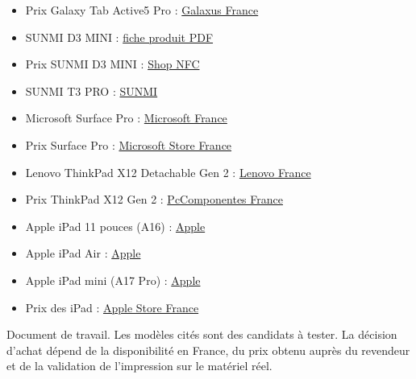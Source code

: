 \documentclass[11pt,a4paper]{article}
\newcommand{\source}[2]{\href{#2}{#1}}
\begin{document}
{\begin{multicols}{2}
\begin{itemize}[itemsep=0pt,topsep=0pt,leftmargin=4mm]
  \item Prix Galaxy Tab Active5 Pro :
  \source{Galaxus France}{https://www.galaxus.fr/fr/s1/product/samsung-galaxy-tab-active5-pro-edition-entreprise-5g-1010-128-go-vert-tablette-57860971}
  \item SUNMI D3 MINI :
  \source{fiche produit PDF}{https://file.cdn.sunmi.com/newebsite/products/d3-mini/specs/d3-mini-en.pdf}
  \item Prix SUNMI D3 MINI :
  \source{Shop NFC}{https://www.shopnfc.com/fr/terminaux-nfc-sunmi/679-sunmi-d3-mini-terminal-de-point-de-vente-android-gms-imprimante-80-mm-cable-ue.html}
  \item SUNMI T3 PRO :
  \source{SUNMI}{https://www.sunmi.com/en-US/t3-pro-series/}
  \item Microsoft Surface Pro :
  \source{Microsoft France}{https://www.microsoft.com/fr-fr/surface/devices/surface-pro/}
  \item Prix Surface Pro :
  \source{Microsoft Store France}{https://www.microsoft.com/fr-fr/store/collections/consumersurface/}
  \item Lenovo ThinkPad X12 Detachable Gen 2 :
  \source{Lenovo France}{https://www.lenovo.com/fr/fr/p/laptops/thinkpad/thinkpadx/lenovo-thinkpad-x12-gen-2-12-inch-intel/21lkcto1wwfr2}
  \item Prix ThinkPad X12 Gen 2 :
  \source{PcComponentes France}{https://www.pccomponentes.fr/portable-lenovo-thinkpad-x12-detachable-gen-2-123-intel-core-ultra-5-134u-16gb-512gb-ssd-intel-graphics-windows-11-pro}
  \item Apple iPad 11 pouces (A16) :
  \source{Apple}{https://www.apple.com/fr/ipad-11/}
  \item Apple iPad Air :
  \source{Apple}{https://www.apple.com/fr/ipad-air/}
  \item Apple iPad mini (A17 Pro) :
  \source{Apple}{https://support.apple.com/fr-fr/121456}
  \item Prix des iPad :
  \source{Apple Store France}{https://www.apple.com/fr/shop/buy-ipad}
\end{itemize}
\end{multicols}
}

\vfill
{\small\color{textgray}
Document de travail. Les modèles cités sont des candidats à tester. La décision d'achat dépend
de la disponibilité en France, du prix obtenu auprès du revendeur et de la validation de
l'impression sur le matériel réel.
}
\end{document}
